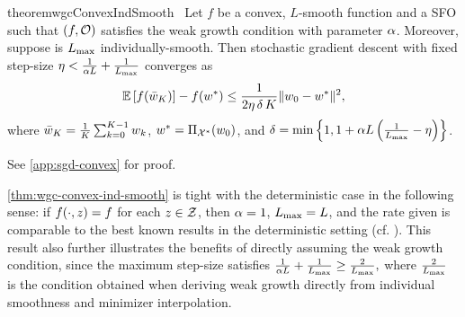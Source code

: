 \begin{restatable}{theorem}{wgcConvexIndSmooth}~\label{thm:wgc-convex-ind-smooth}
    Let \( f \) be a convex, \( L \)-smooth function and \oracle{} a \ac{SFO} such that \( \rbr{f, \oracle{}} \) satisfies the weak growth condition with parameter \( \wgc \).
    Moreover, suppose \oracle{} is \( \Lmax \) individually-smooth. 
    Then stochastic gradient descent with fixed step-size \( \eta < \frac{1}{\wgc L} + \frac{1}{\Lmax} \) converges as
    \[ \E\sbr{f(\bar w_K)} - f(\wopt) \leq \frac{1}{2\eta \, \delta \, K} \norm{\w_0 - \wopt}^2,   \]
    where \( \bar \w_K = \frac{1}{K} \sum_{k=0}^{K-1} \wk \), \( \wopt = \Pi_{\calX^*}(\w_0) \), and \( \delta = \min \cbr{ 1, 1 + \wgc L \rbr{\frac{1}{\Lmax} - \eta }} \).
\end{restatable}
\noindent See \autoref{app:sgd-convex} for proof. \hfill \break

\autoref{thm:wgc-convex-ind-smooth} is tight with the deterministic case in the following sense: if \( f(\cdot, \z) = f \) for each \( z \in \calZ \), then \( \wgc = 1 \), \( \Lmax = L \), and the rate given is comparable to the best known results in the deterministic setting (cf. \citet[Theorem 3.3]{bubeck2015convex}). 
This result also further illustrates the benefits of directly assuming the weak growth condition, since the maximum step-size satisfies 
\( \frac{1}{\wgc L} + \frac{1}{\Lmax} \geq \frac{2}{\Lmax}, \)
where \( \frac{2}{\Lmax} \) is the condition obtained when deriving weak growth directly from individual smoothness and minimizer interpolation.\\

